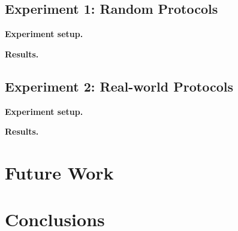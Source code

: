 \documentclass[conference]{IEEEtran}
\renewcommand{\paragraph}[1]{\vspace*{2pt}\noindent\textbf{#1}}
\begin{document}
\subsection{Experiment 1: Random Protocols}
\label{sec:experiment-1:-random}

\paragraph{Experiment setup.}

\paragraph{Results.}

\subsection{Experiment 2: Real-world Protocols}
\label{sec:experiment-2:-real}

\paragraph{Experiment setup.}

\paragraph{Results.}



\section{Future Work}


\section{Conclusions}
\end{document}
